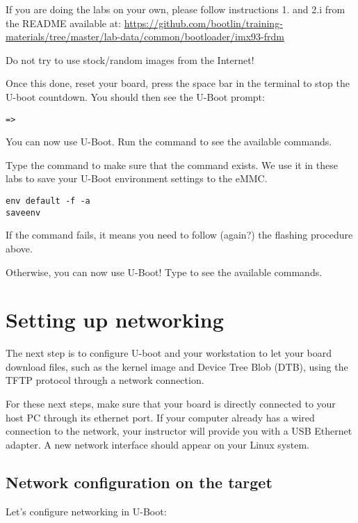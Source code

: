 If you are doing the labs on your own, please follow instructions 1. and
2.i from the README available at:
\url{https://github.com/bootlin/training-materials/tree/master/lab-data/common/bootloader/imx93-frdm}

Do not try to use stock/random images from the Internet!

Once this done, reset your board, press the space bar in the
 terminal to stop the U-boot countdown. You should then see the
U-Boot prompt:

\begin{verbatim}
=>
\end{verbatim}

You can now use U-Boot. Run the  command to see the available
commands.

Type the  command to make sure that the
 command exists. We use it in these labs to
save your U-Boot environment settings to the eMMC.

\begin{verbatim}
env default -f -a
saveenv
\end{verbatim}

If the  command fails, it means you need to follow
(again?) the flashing procedure above.

Otherwise, you can now use U-Boot! Type  to see the available
commands.

\section{Setting up networking}

The next step is to configure U-boot and your workstation to let your
board download files, such as the kernel image and Device Tree Blob
(DTB), using the TFTP protocol through a network connection.

For these next steps, make sure that your board is directly connected
to your host PC through its ethernet port. If your computer already has a wired
connection to the network, your instructor will provide you with a USB Ethernet
adapter. A new network interface should appear on your Linux system.

\subsection{Network configuration on the target}

Let's configure networking in U-Boot:

